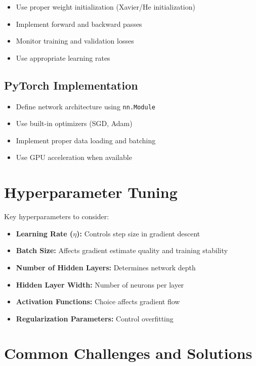 \documentclass{article}
\begin{document}
\begin{itemize}
    \item Use proper weight initialization (Xavier/He initialization)
    \item Implement forward and backward passes
    \item Monitor training and validation losses
    \item Use appropriate learning rates
\end{itemize}

\subsection{PyTorch Implementation}

\begin{itemize}
    \item Define network architecture using \texttt{nn.Module}
    \item Use built-in optimizers (SGD, Adam)
    \item Implement proper data loading and batching
    \item Use GPU acceleration when available
\end{itemize}

\section{Hyperparameter Tuning}

Key hyperparameters to consider:

\begin{itemize}
    \item \textbf{Learning Rate ($\eta$):} Controls step size in gradient descent
    \item \textbf{Batch Size:} Affects gradient estimate quality and training stability
    \item \textbf{Number of Hidden Layers:} Determines network depth
    \item \textbf{Hidden Layer Width:} Number of neurons per layer
    \item \textbf{Activation Functions:} Choice affects gradient flow
    \item \textbf{Regularization Parameters:} Control overfitting
\end{itemize}

\section{Common Challenges and Solutions}
\end{document}
